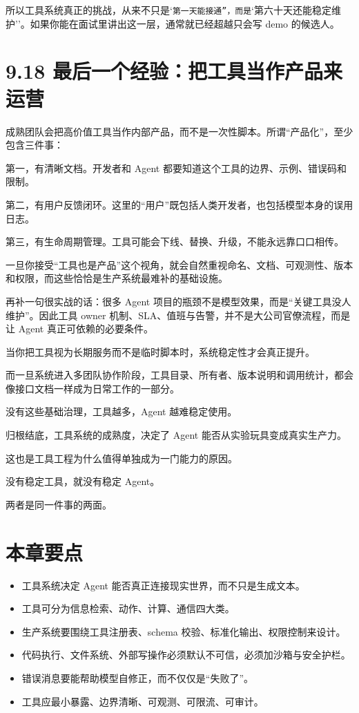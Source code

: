 所以工具系统真正的挑战，从来不只是`\texttt{第一天能接通''，而是}`第六十天还能稳定维护''。如果你能在面试里讲出这一层，通常就已经超越只会写 demo 的候选人。


\section{9.18 最后一个经验：把工具当作产品来运营}

成熟团队会把高价值工具当作内部产品，而不是一次性脚本。所谓``产品化''，至少包含三件事：


第一，有清晰文档。开发者和 Agent 都要知道这个工具的边界、示例、错误码和限制。

第二，有用户反馈闭环。这里的``用户''既包括人类开发者，也包括模型本身的误用日志。

第三，有生命周期管理。工具可能会下线、替换、升级，不能永远靠口口相传。


一旦你接受``工具也是产品''这个视角，就会自然重视命名、文档、可观测性、版本和权限，而这些恰恰是生产系统最难补的基础设施。


再补一句很实战的话：很多 Agent 项目的瓶颈不是模型效果，而是``关键工具没人维护''。因此工具 owner 机制、SLA、值班与告警，并不是大公司官僚流程，而是让 Agent 真正可依赖的必要条件。

当你把工具视为长期服务而不是临时脚本时，系统稳定性才会真正提升。

而一旦系统进入多团队协作阶段，工具目录、所有者、版本说明和调用统计，都会像接口文档一样成为日常工作的一部分。

没有这些基础治理，工具越多，Agent 越难稳定使用。

归根结底，工具系统的成熟度，决定了 Agent 能否从实验玩具变成真实生产力。

这也是工具工程为什么值得单独成为一门能力的原因。

没有稳定工具，就没有稳定 Agent。

两者是同一件事的两面。


\section{本章要点}

\begin{itemize}[leftmargin=2em]
\item 工具系统决定 Agent 能否真正连接现实世界，而不只是生成文本。
\item 工具可分为信息检索、动作、计算、通信四大类。
\item 生产系统要围绕工具注册表、schema 校验、标准化输出、权限控制来设计。
\item 代码执行、文件系统、外部写操作必须默认不可信，必须加沙箱与安全护栏。
\item 错误消息要能帮助模型自修正，而不仅仅是``失败了''。
\item 工具应最小暴露、边界清晰、可观测、可限流、可审计。
\end{itemize}

